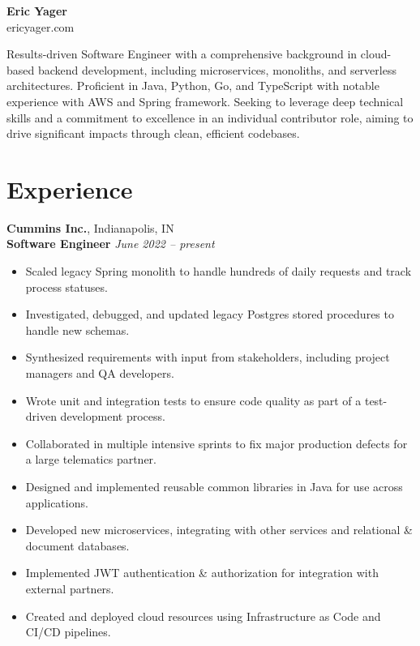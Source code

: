 \documentclass[10pt,letterpaper]{article}
\begin{document}
\begin{center}
    {\huge\bfseries Eric Yager}\\
    {\large ericyager.com \textbar\ \myEmail\ \textbar\ \myPhoneNumber}
\end{center}

\vspace{-1.75em}

\noindent\hrulefill

\noindent Results-driven Software Engineer with a comprehensive background in cloud-based backend development,
including microservices, monoliths, and serverless architectures. Proficient in Java, Python, Go, and TypeScript
with notable experience with AWS and Spring framework. Seeking to leverage deep technical skills and a
commitment to excellence in an individual contributor role, aiming to drive significant impacts through clean,
efficient codebases.

\vspace{-.75em}
\noindent\hrulefill
\vspace{-.5em}

\section*{Experience}

\noindent\textbf{Cummins Inc.}, Indianapolis, IN\\
\noindent\textbf{Software Engineer} \hfill \textit{June 2022 -- present}
\begin{itemize}
    \item Scaled legacy Spring monolith to handle hundreds of daily requests and track process statuses.
    \item Investigated, debugged, and updated legacy Postgres stored procedures to handle new schemas.
    \item Synthesized requirements with input from stakeholders, including project managers and QA developers.
    \item Wrote unit and integration tests to ensure code quality as part of a test-driven development process.
    \item Collaborated in multiple intensive sprints to fix major production defects for a large telematics partner.
    \item Designed and implemented reusable common libraries in Java for use across applications.
    \item Developed new microservices, integrating with other services and relational \& document databases.
    \item Implemented JWT authentication \& authorization for integration with external partners.
    \item Created and deployed cloud resources using Infrastructure as Code and CI/CD pipelines.
\end{itemize}
\end{document}
